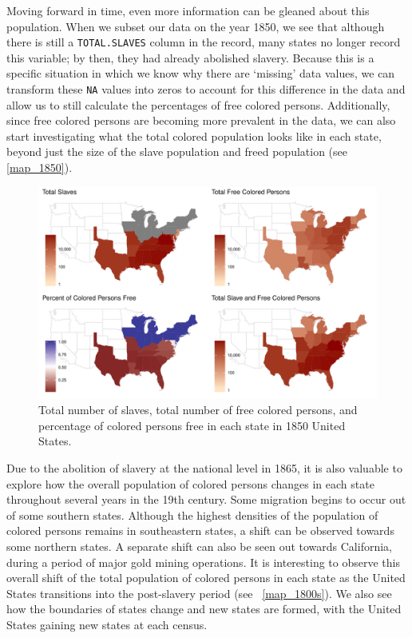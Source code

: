 \documentclass[DIV=calc, paper=a4, fontsize=10pt, twocolumn]{scrartcl}\usepackage[]{graphicx}\usepackage[]{color}
\newenvironment{knitrout}{}{} %
\begin{document}
\par Moving forward in time, even more information can be gleaned about this population. When we subset our data on the year 1850, we see that although there is still a \texttt{TOTAL.SLAVES} column in the record, many states no longer record this variable; by then, they had already abolished slavery. Because this is a specific situation in which we know why there are `missing' data values, we can transform these \texttt{NA} values into zeros to account for this difference in the data and allow us to still calculate the percentages of free colored persons. Additionally, since free colored persons are becoming more prevalent in the data, we can also start investigating what the total colored population looks like in each state, beyond just the size of the slave population and freed population (see \autoref{map_1850}).


\begin{knitrout}
\color{fgcolor}\begin{figure}[h]
\includegraphics[width=.5\textwidth]{figure/map_1850-1} \caption[Total number of slaves, total number of free colored persons, and percentage of colored persons free in each state in 1850 United States]{Total number of slaves, total number of free colored persons, and percentage of colored persons free in each state in 1850 United States.}\label{fig:map_1850}
\end{figure}


\end{knitrout}

\par Due to the abolition of slavery at the national level in 1865, it is also valuable to explore how the overall population of colored persons changes in each state throughout several years in the 19th century. Some migration begins to occur out of some southern states. Although the highest densities of the population of colored persons remains in southeastern states, a shift can be observed towards some northern states. A separate shift can also be seen out towards California, during a period of major gold mining operations. It is interesting to observe this overall shift of the total population of colored persons in each state as the United States transitions into the post-slavery period (see ~\autoref{map_1800s}). We also see how the boundaries of states change and new states are formed, with the United States gaining new states at each census.  
\end{document}
